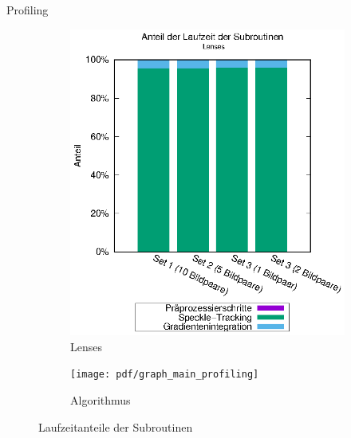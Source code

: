 \begin{frame}[allowframebreaks]{Profiling}
\begin{center}
\begin{figure}[h]
\begin{subfigure}[b]{0.4\linewidth}
				\includegraphics[width=\linewidth]{pdf/main_lenses.eps}
				\caption{Lenses}
			\end{subfigure}
			\hspace{-0.3cm}
			\begin{subfigure}[b]{0.33\linewidth}
				\centering
				\texttt{[image: pdf/graph\_main\_profiling]}
				\caption{Algorithmus}
			\end{subfigure}
		\caption{Laufzeitanteile der Subroutinen}
		\end{figure}
		

\end{center}
\end{frame}
